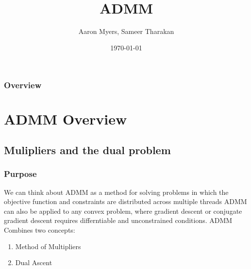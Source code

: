 \documentclass{beamer}
\title[ADMM]{ADMM} %
\author{Aaron Myers, Sameer Tharakan} %
\institute[UT Austin - ICES] %
{
University of Texas at Austin \\ %
\medskip
}
\date{\today} %
\begin{document}
\begin{frame}
\titlepage %
\end{frame}

\begin{frame}
\frametitle{Overview} %
\tableofcontents %
\end{frame}


\section{ADMM Overview} %

\subsection{Mulipliers and the dual problem} %

\begin{frame}
\frametitle{Purpose}
We can think about ADMM as a method for solving problems in which the objective function and constraints are distributed across multiple threads 
\linebreak
\newline
ADMM can also be applied to any convex problem, where gradient descent or conjugate gradient descent requires differntiable and unconstrained conditions.
\linebreak
\newline
ADMM Combines two concepts:
\begin{enumerate}
  \item Method of Multipliers
  \item Dual Ascent
\end{enumerate}
\end{frame}
\end{document}
